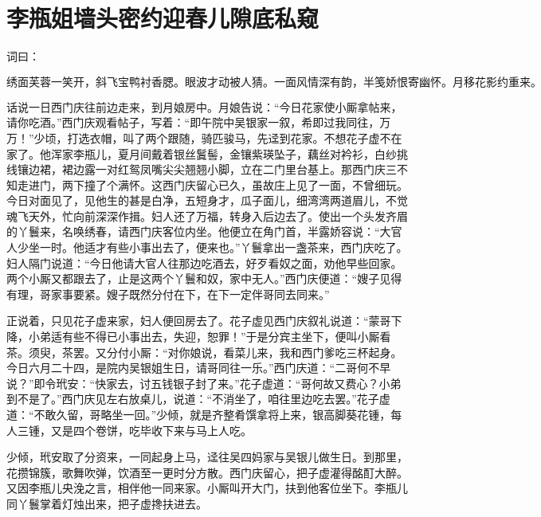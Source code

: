 

\chapter{李瓶姐墙头密约\KG 迎春儿隙底私窥}


词曰：

\[
绣面芙蓉一笑开，斜飞宝鸭衬香腮。眼波才动被人猜。一面风情深有韵，半笺娇恨寄幽怀。月移花影约重来。
\]

话说一日西门庆往前边走来，到月娘房中。月娘告说：“今日花家使小厮拿帖来，请你吃酒。”西门庆观看帖子，写着：“即午院中吴银家一叙，希即过我同往，万万！”少顷，打选衣帽，叫了两个跟随，骑匹骏马，先迳到花家。不想花子虚不在家了。他浑家李瓶儿，夏月间戴着银丝鬒髻，金镶紫瑛坠子，藕丝对衿衫，白纱挑线镶边裙，裙边露一对红鸳凤嘴尖尖翘翘小脚，立在二门里台基上。那西门庆三不知走进门，两下撞了个满怀。这西门庆留心已久，虽故庄上见了一面，不曾细玩。今日对面见了，见他生的甚是白净，五短身才，瓜子面儿，细湾湾两道眉儿，不觉魂飞天外，忙向前深深作揖。妇人还了万福，转身入后边去了。使出一个头发齐眉的丫鬟来，名唤绣春，请西门庆客位内坐。他便立在角门首，半露娇容说：“大官人少坐一时。他适才有些小事出去了，便来也。”丫鬟拿出一盏茶来，西门庆吃了。妇人隔门说道：“今日他请大官人往那边吃酒去，好歹看奴之面，劝他早些回家。两个小厮又都跟去了，止是这两个丫鬟和奴，家中无人。”西门庆便道：“嫂子见得有理，哥家事要紧。嫂子既然分付在下，在下一定伴哥同去同来。”

正说着，只见花子虚来家，妇人便回房去了。花子虚见西门庆叙礼说道：“蒙哥下降，小弟适有些不得已小事出去，失迎，恕罪！”于是分宾主坐下，便叫小厮看茶。须臾，茶罢。又分付小厮：“对你娘说，看菜儿来，我和西门爹吃三杯起身。今日六月二十四，是院内吴银姐生日，请哥同往一乐。”西门庆道：“二哥何不早说？”即令玳安：“快家去，讨五钱银子封了来。”花子虚道：“哥何故又费心？小弟到不是了。”西门庆见左右放桌儿，说道：“不消坐了，咱往里边吃去罢。”花子虚道：“不敢久留，哥略坐一回。”少倾，就是齐整肴馔拿将上来，银高脚葵花锺，每人三锺，又是四个卷饼，吃毕收下来与马上人吃。

少倾，玳安取了分资来，一同起身上马，迳往吴四妈家与吴银儿做生日。到那里，花攒锦簇，歌舞吹弹，饮酒至一更时分方散。西门庆留心，把子虚灌得酩酊大醉。又因李瓶儿央浼之言，相伴他一同来家。小厮叫开大门，扶到他客位坐下。李瓶儿同丫鬟掌着灯烛出来，把子虚搀扶进去。

